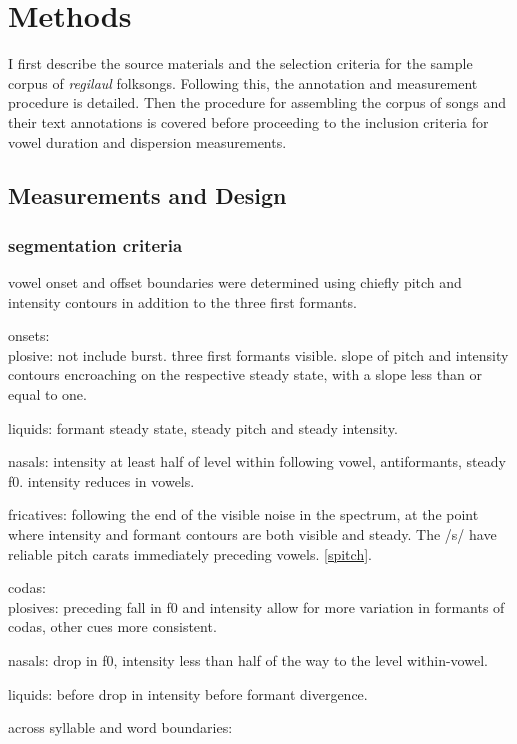 \chapter{Methods}
%
I first describe the source materials and the selection criteria for the sample corpus of {\it regilaul} folksongs. Following this, the annotation and measurement procedure is detailed. Then the procedure for assembling the corpus of songs and their text annotations is covered before proceeding to the inclusion criteria for vowel duration and dispersion measurements.


\section{Measurements and Design}
\subsection{segmentation criteria}

vowel onset and offset boundaries were determined using chiefly pitch and intensity contours in addition to the three first formants.

onsets: \\

plosive: not include burst. three first formants visible. slope of pitch and intensity contours encroaching on the respective steady state, with a slope less than or equal to one. 

liquids: formant steady state, steady pitch and steady intensity. 

nasals: intensity at least half of level within following vowel, antiformants, steady f0. intensity reduces in vowels. 

fricatives: following the end of the visible noise in the spectrum, at the point where intensity and formant contours are both visible and steady. The /s/  have reliable pitch carats immediately preceding vowels. \ref{spitch}. 

codas: \\

plosives: preceding fall in f0 and intensity
allow for more variation in formants of codas, other cues more consistent.

nasals: drop in f0, intensity less than half of the way to the level within-vowel. 

liquids: before drop in intensity 
before formant divergence.

across syllable and word boundaries: \\


